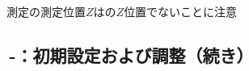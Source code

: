 \begin{marker}
\nameOutcutCenter 測定\MXIface の測定位置$Z$は\EndFace の$Z$位置でないことに注意
\end{marker}


\clearpage
\subsection{\,-：初期設定および調整（続き）}

